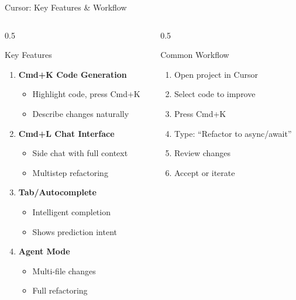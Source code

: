 \documentclass[aspectratio=169,11pt]{beamer}
\begin{document}
\begin{frame}{Cursor: Key Features \& Workflow}
    \begin{columns}[T]
        \begin{column}{0.5\textwidth}
            \begin{block}{Key Features}
                \begin{enumerate}
                    \item \textbf{Cmd+K Code Generation}
                    \begin{itemize}
                        \item Highlight code, press Cmd+K
                        \item Describe changes naturally
                    \end{itemize}
                    \item \textbf{Cmd+L Chat Interface}
                    \begin{itemize}
                        \item Side chat with full context
                        \item Multistep refactoring
                    \end{itemize}
                    \item \textbf{Tab/Autocomplete}
                    \begin{itemize}
                        \item Intelligent completion
                        \item Shows prediction intent
                    \end{itemize}
                    \item \textbf{Agent Mode}
                    \begin{itemize}
                        \item Multi-file changes
                        \item Full refactoring
                    \end{itemize}
                \end{enumerate}
            \end{block}
        \end{column}
        \begin{column}{0.5\textwidth}
            \begin{exampleblock}{Common Workflow}
                \begin{enumerate}
                    \item Open project in Cursor
                    \item Select code to improve
                    \item Press Cmd+K
                    \item Type: ``Refactor to async/await''
                    \item Review changes
                    \item Accept or iterate
                \end{enumerate}
            \end{exampleblock}


\end{column}
\end{columns}
\end{frame}
\end{document}
